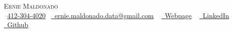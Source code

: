 	\begin{center}
	{\Huge \scshape Ernie Maldonado} \\ \vspace{5pt}
	\small \raisebox{-0.1\height}\faPhone\ \href{tel:14123044020}{412-304-4020}~ \href{mailto:ernie.maldonado.data@gmail.com}{\raisebox{-0.2\height}\faEnvelope\  \underline{ernie.maldonado.data@gmail.com}} ~
	\href{https://hernanmaldonado.github.io}{\raisebox{-0.2\height}\faGlobe\ \underline{Webpage}} ~
	\href{https://www.linkedin.com/in/erniemaldonado-excellence}{\raisebox{-0.2\height}\faLinkedin\ \underline{LinkedIn}}  ~
	\href{https://github.com/hernanmaldonado/}{\raisebox{-0.2\height}\faGithub\ \underline{Github}}
	\vspace{-8pt}
\end{center}